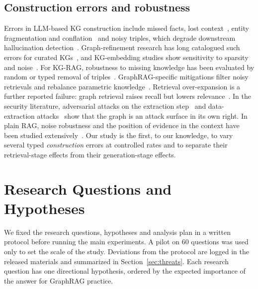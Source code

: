 \documentclass[11pt]{article}
\begin{document}
\subsection{Construction errors and robustness}
Errors in LLM-based KG construction include missed facts, lost context~\cite{huang2025tcrqf}, entity fragmentation and conflation~\cite{cai2025extraction,christophides2021er} and noisy triples, which degrade downstream hallucination detection~\cite{kumar2026hallubench}. Graph-refinement research has long catalogued such errors for curated KGs~\cite{paulheim2017refinement}, and KG-embedding studies show sensitivity to sparsity and noise~\cite{pujara2017sparsity}. For KG-RAG, robustness to missing knowledge has been evaluated by random or typed removal of triples~\cite{zhou2025incomplete,wang2026missdiag}. GraphRAG-specific mitigations filter noisy retrievals and rebalance parametric knowledge~\cite{guo2025graphragfi}. Retrieval over-expansion is a further reported failure: graph retrieval raises recall but lowers relevance~\cite{wu2026memgraphrag}. In the security literature, adversarial attacks on the extraction step~\cite{liang2025underfire,wen2025fewwords} and data-extraction attacks~\cite{liu2025privacy} show that the graph is an attack surface in its own right. In plain RAG, noise robustness and the position of evidence in the context have been studied extensively~\cite{chen2024rgb,cuconasu2024power,liu2024lost,xie2023adaptive,zou2024poisonedrag}. Our study is the first, to our knowledge, to vary several typed \emph{construction} errors at controlled rates and to separate their retrieval-stage effects from their generation-stage effects.

\section{Research Questions and Hypotheses}\label{sec:design}
We fixed the research questions, hypotheses and analysis plan in a written protocol before running the main experiments. A pilot on 60 questions was used only to set the scale of the study. Deviations from the protocol are logged in the released materials and summarized in Section~\ref{sec:threats}. Each research question has one directional hypothesis, ordered by the expected importance of the answer for GraphRAG practice.
\end{document}
